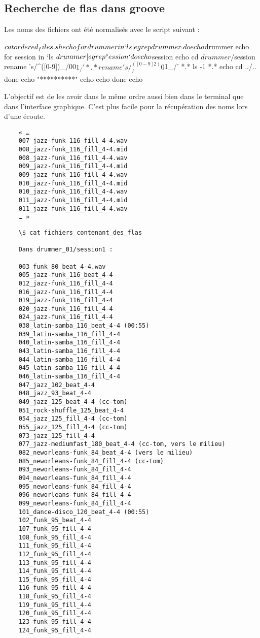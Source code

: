 \subsection{Recherche de flas dans groove}
	Les noms des fichiers ont été normalisés avec le script suivant :
	\begin{verbatimtab}
	$ cat ordered_files.sh 
	echo
	for drummer in `ls | egrep drummer_`
	do
		echo $drummer
		echo
		for session in `ls $drummer | egrep ^session`
		do
			echo $session
			echo
			cd $drummer/$session
			rename 's/^([0-9])_/00$1_/' *.* 
			rename 's/^([0-9]{2})_/0$1_/' *.* 
			ls -1 *.*
			echo
			cd ../..
		done
		echo "**********"
		echo
		echo
	done
	echo
	\end{verbatimtab}
	L’objectif est de les avoir dans le même ordre aussi bien dans le terminal que dans
	l’interface graphique. C’est plus facile pour la récupération des noms lors d’une écoute.
	\begin{verbatim}
	« …
	007_jazz-funk_116_fill_4-4.wav
	008_jazz-funk_116_fill_4-4.mid
	008_jazz-funk_116_fill_4-4.wav
	009_jazz-funk_116_fill_4-4.mid
	009_jazz-funk_116_fill_4-4.wav
	010_jazz-funk_116_fill_4-4.mid
	010_jazz-funk_116_fill_4-4.wav
	011_jazz-funk_116_fill_4-4.mid
	011_jazz-funk_116_fill_4-4.wav
	… »
	\end{verbatim}
	\begin{verbatim}
	\$ cat fichiers_contenant_des_flas 
	
	Dans drummer_01/session1 :
	
	003_funk_80_beat_4-4.wav
	005_jazz-funk_116_beat_4-4
	012_jazz-funk_116_fill_4-4
	016_jazz-funk_116_fill_4-4
	019_jazz-funk_116_fill_4-4
	020_jazz-funk_116_fill_4-4
	024_jazz-funk_116_fill_4-4
	038_latin-samba_116_beat_4-4 (00:55)
	039_latin-samba_116_fill_4-4
	040_latin-samba_116_fill_4-4
	043_latin-samba_116_fill_4-4
	044_latin-samba_116_fill_4-4
	045_latin-samba_116_fill_4-4
	046_latin-samba_116_fill_4-4
	047_jazz_102_beat_4-4
	048_jazz_93_beat_4-4
	049_jazz_125_beat_4-4 (cc-tom)
	051_rock-shuffle_125_beat_4-4
	054_jazz_125_fill_4-4 (cc-tom)
	055_jazz_125_fill_4-4 (cc-tom)
	073_jazz_125_fill_4-4
	077_jazz-mediumfast_180_beat_4-4 (cc-tom, vers le milieu)
	082_neworleans-funk_84_beat_4-4 (vers le milieu)
	085_neworleans-funk_84_fill_4-4 (cc-tom)
	093_neworleans-funk_84_fill_4-4
	094_neworleans-funk_84_fill_4-4
	095_neworleans-funk_84_fill_4-4
	096_neworleans-funk_84_fill_4-4
	099_neworleans-funk_84_fill_4-4
	101_dance-disco_120_beat_4-4 (00:55)
	102_funk_95_beat_4-4
	107_funk_95_fill_4-4
	108_funk_95_fill_4-4
	111_funk_95_fill_4-4
	112_funk_95_fill_4-4
	113_funk_95_fill_4-4
	114_funk_95_fill_4-4
	115_funk_95_fill_4-4
	116_funk_95_fill_4-4
	118_funk_95_fill_4-4
	119_funk_95_fill_4-4
	120_funk_95_fill_4-4
	123_funk_95_fill_4-4
	124_funk_95_fill_4-4
	\end{verbatim}